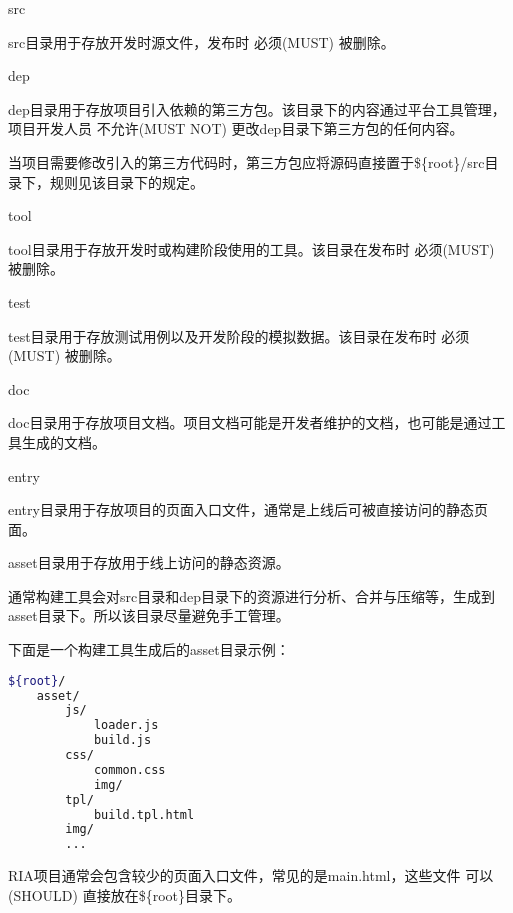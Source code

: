 \begin{compactitem}
\item src

src目录用于存放开发时源文件，发布时 必须(MUST) 被删除。

\item dep

dep目录用于存放项目引入依赖的第三方包。该目录下的内容通过平台工具管理，项目开发人员 不允许(MUST NOT) 更改dep目录下第三方包的任何内容。

当项目需要修改引入的第三方代码时，第三方包应将源码直接置于\$\{root\}/src目录下，规则见该目录下的规定。


\item tool

tool目录用于存放开发时或构建阶段使用的工具。该目录在发布时 必须(MUST) 被删除。

\item test

test目录用于存放测试用例以及开发阶段的模拟数据。该目录在发布时 必须(MUST) 被删除。

\item doc

doc目录用于存放项目文档。项目文档可能是开发者维护的文档，也可能是通过工具生成的文档。

\item entry

entry目录用于存放项目的页面入口文件，通常是上线后可被直接访问的静态页面。

\item asset目录用于存放用于线上访问的静态资源。

通常构建工具会对src目录和dep目录下的资源进行分析、合并与压缩等，生成到asset目录下。所以该目录尽量避免手工管理。



\end{compactitem}


下面是一个构建工具生成后的asset目录示例：




\begin{lstlisting}[language=bash]
${root}/
    asset/
        js/
            loader.js
            build.js
        css/
            common.css
            img/
        tpl/
            build.tpl.html
        img/
        ...
\end{lstlisting}




RIA项目通常会包含较少的页面入口文件，常见的是main.html，这些文件 可以(SHOULD) 直接放在\$\{root\}目录下。





